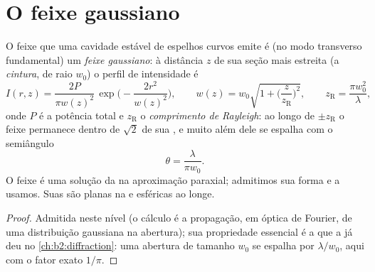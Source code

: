 \section{O feixe gaussiano}

\begin{proposition}\label{prop:b2:laser:gaussian}
O feixe que uma cavidade estável de espelhos curvos emite é (no
modo transverso fundamental) um \emph{feixe gaussiano}: à distância $z$ de sua seção mais estreita (a
\emph{cintura}, de raio $w_0$) o perfil
de intensidade é
\[
I(r,z) = \frac{2P}{\pi w(z)^2}\,\exp\Big(-\frac{2r^2}{w(z)^2}\Big),
\qquad
w(z) = w_0\sqrt{1 + \Big(\frac{z}{z_{\text{R}}}\Big)^2},
\qquad
z_{\text{R}} = \frac{\pi w_0^2}{\lambda},
\]
onde $P$ é a potência total e $z_{\text{R}}$ o \emph{comprimento de
Rayleigh}: ao longo de $\pm z_{\text{R}}$ o feixe permanece
dentro de $\sqrt2$ de sua , e muito além dele se espalha com o
semiângulo
\[
\theta = \frac{\lambda}{\pi w_0} .
\]
O feixe é uma solução da  na aproximação
paraxial; admitimos sua forma e a usamos. Suas  são planas na
 e esféricas ao longe.
\end{proposition}

\begin{proof}
Admitida neste nível (o cálculo é a propagação, em óptica de Fourier,
de uma distribuição gaussiana na abertura); sua propriedade essencial é
a que a  já deu no \cref{ch:b2:diffraction}: uma
abertura de tamanho $w_0$ se espalha por $\lambda/w_0$, aqui com o fator exato
$1/\pi$.
\end{proof}

